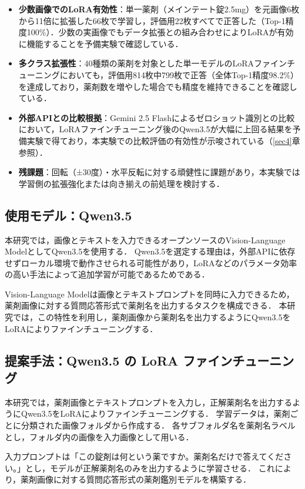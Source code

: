 \documentclass{jsarticle}
\begin{document}
\begin{itemize}
  \item \textbf{少数画像でのLoRA有効性}：単一薬剤（メインテート錠2.5mg）を元画像6枚から11倍に拡張した66枚で学習し，評価用22枚すべてで正答した（Top-1精度100\%）．少数の実画像でもデータ拡張との組み合わせによりLoRAが有効に機能することを予備実験で確認している．
  \item \textbf{多クラス拡張性}：40種類の薬剤を対象とした単一モデルのLoRAファインチューニングにおいても，評価用814枚中799枚で正答（全体Top-1精度98.2\%）を達成しており，薬剤数を増やした場合でも精度を維持できることを確認している．
  \item \textbf{外部APIとの比較根拠}：Gemini 2.5 Flashによるゼロショット識別との比較において，LoRAファインチューニング後のQwen3.5が大幅に上回る結果を予備実験で得ており，本実験での比較評価の有効性が示唆されている（\ref{sec4}章参照）．
  \item \textbf{残課題}：回転（±30度）・水平反転に対する頑健性に課題があり，本実験では学習側の拡張強化または向き揃えの前処理を検討する．
\end{itemize}

\subsection{使用モデル：Qwen3.5}

本研究では，画像とテキストを入力できるオープンソースのVision-Language ModelとしてQwen3.5を使用する．
Qwen3.5を選定する理由は，外部APIに依存せずローカル環境で動作させられる可能性があり，LoRAなどのパラメータ効率の高い手法によって追加学習が可能であるためである．

Vision-Language Modelは画像とテキストプロンプトを同時に入力できるため，薬剤画像に対する質問応答形式で薬剤名を出力するタスクを構成できる．
本研究では，この特性を利用し，薬剤画像から薬剤名を出力するようにQwen3.5をLoRAによりファインチューニングする．

\subsection{提案手法：Qwen3.5 の LoRA ファインチューニング}

本研究では，薬剤画像とテキストプロンプトを入力し，正解薬剤名を出力するようにQwen3.5をLoRAによりファインチューニングする．
学習データは，薬剤ごとに分類された画像フォルダから作成する．
各サブフォルダ名を薬剤名ラベルとし，フォルダ内の画像を入力画像として用いる．

入力プロンプトは「この錠剤は何という薬ですか。薬剤名だけで答えてください。」とし，モデルが正解薬剤名のみを出力するように学習させる．
これにより，薬剤画像に対する質問応答形式の薬剤鑑別モデルを構築する．
\end{document}
